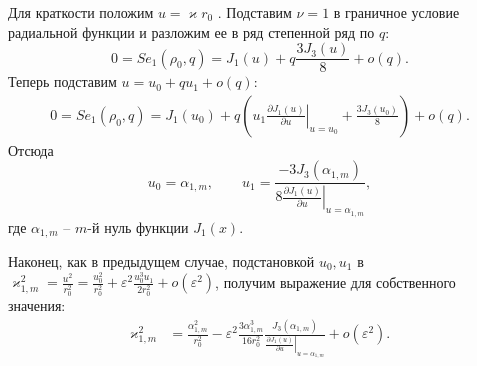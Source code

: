 Для краткости положим $u = \varkappa r_0$ .
Подставим $\nu = 1$ в граничное условие радиальной функции и разложим ее в ряд степенной ряд по $q$:
\begin{equation*}
    0 = Se_1(\rho_0, q) = 
    J_1(u) + q  \frac{3 J_3(u)}{8} + o(q).
\end{equation*}
Теперь подставим $u = u_0 + q u_1 + o(q)$:
\begin{align*}
    0 = Se_1(\rho_0, q) =    J_1(u_0) + q \left( 
    u_1 \left.\frac{\partial J_1 (u)}{\partial u}\right|_{u=u_0}
    + \frac{3 J_3(u_0)}{8}
    \right) + o(q).
\end{align*}
Отсюда 
\begin{equation*}
u_0 = \alpha_{1, m}, \qquad u_1 = 
\frac{ - 3 J_3(\alpha_{1, m}) }{8\left.
\frac{\partial J_1 (u)}{\partial u}\right|_{u=\alpha_{1, m}}},
\end{equation*}
где $\alpha_{1, m}$ -- $m$-й нуль функции $J_1(x)$. 

Наконец, как в предыдущем случае, подстановкой $u_0, u_1$ в $\varkappa_{1, m}^2 = \frac{u^2}{r_0^2} = \frac{u_0^2}{r_0^2} + \varepsilon^2 \frac{u_0^3 u_1}{2r_0^2} + o(\varepsilon^2)$, получим выражение для собственного значения:
\begin{align}
    \varkappa_{1, m}^2& = \frac{\alpha_{1, m}^2}{r_0^2} - \varepsilon^2 \frac{3\alpha_{1, m}^3}{16r_0^2} 
    \frac{J_3(\alpha_{1, m})}{\left.\frac{\partial J_1 (u)}{\partial u}\right|_{u=\alpha_{1, m}}} 
    + o(\varepsilon^2).  \label{eq:valS2}
\end{align}



\FloatBarrier
